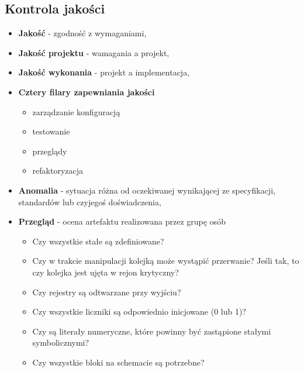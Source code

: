 \documentclass[../main.tex]{subfiles}
\begin{document}
    \pagebreak
    \subsection{Kontrola jakości}


    \begin{itemize}
        \item \textbf{Jakość} - zgodność z wymaganiami,
        \item \textbf{Jakość projektu} - wamagania a projekt,
        \item \textbf{Jakość wykonania} - projekt a implementacja,
        \item \textbf{Cztery filary zapewniania jakości}
        \begin{itemize}
            \item zarządzanie konfiguracją
            \item testowanie
            \item przeglądy
            \item refaktoryzacja
        \end{itemize}
        \item \textbf{Anomalia} - sytuacja różna od oczekiwanej wynikającej ze specyfikacji, standardów lub
        czyjegoś doświadczenia,
        \item \textbf{Przegląd} - ocena artefaktu realizowana przez grupę osób
        \begin{itemize}
            \item Czy wszystkie stałe są zdefiniowane?
            \item Czy w trakcie manipulacji kolejką może wystąpić przerwanie? Jeśli tak, to czy kolejka jest
            ujęta w rejon krytyczny?
            \item Czy rejestry są odtwarzane przy wyjściu?
            \item Czy wszystkie liczniki są odpowiednio inicjowane (0 lub 1)?
            \item Czy są literały numeryczne, które powinny być zastąpione stałymi symbolicznymi?
            \item Czy wszystkie bloki na schemacie są potrzebne?
        \end{itemize}
    \end{itemize}
\end{document}
